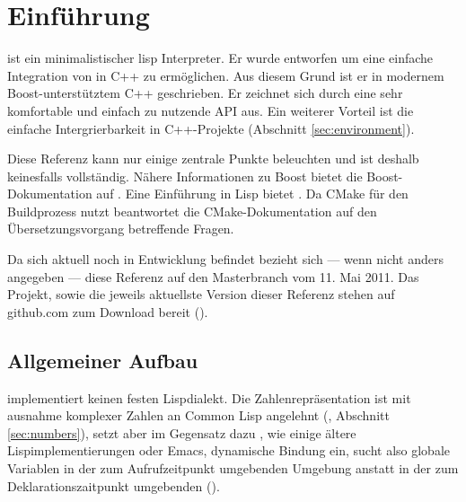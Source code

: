 \section{Einführung}
\label{sec:einfuehrung}

\projectname{} ist ein minimalistischer lisp Interpreter. Er wurde entworfen um eine einfache
Integration von in C++ zu ermöglichen. Aus diesem Grund ist er in modernem Boost-unterstütztem
C++ geschrieben. Er zeichnet sich durch eine sehr komfortable und einfach zu nutzende API aus.
Ein weiterer Vorteil ist die einfache Intergrierbarkeit in C++-Projekte (Abschnitt \ref{sec:environment}).

Diese Referenz kann nur einige zentrale Punkte beleuchten und ist deshalb keinesfalls vollständig. Nähere Informationen zu Boost bietet die Boost-Do\-ku\-men\-ta\-tion auf \cite{smart_ptr_online}. Eine Einführung in Lisp bietet \cite{graham_ansi_1995}. Da \projectname{} CMake für den Buildprozess nutzt beantwortet die CMake-Dokumentation auf \cite{cmake_online} den Übersetzungsvorgang betreffende Fragen.

Da sich \projectname{} aktuell noch in Entwicklung befindet bezieht sich --- wenn nicht anders angegeben --- diese Referenz auf den Masterbranch vom 11. Mai 2011.
Das Projekt, sowie die jeweils aktuellste Version dieser Referenz stehen auf github.com zum Download bereit (\cite{lisp_interaction_online}\cite{lisp_interaction_ref_online}). %

\subsection{Allgemeiner Aufbau}


\projectname{} implementiert keinen festen Lispdialekt. Die Zahlenrepräsentation ist mit ausnahme komplexer Zahlen an Common Lisp angelehnt (\cite[S. 143ff]{graham_ansi_1995}, Abschnitt \ref{sec:numbers}), setzt aber im Gegensatz dazu , wie einige ältere Lispimplementierungen oder Emacs, dynamische Bindung ein, sucht also globale Variablen in der zum Aufrufzeitpunkt umgebenden Umgebung anstatt in der zum Deklarationszaitpunkt umgebenden (\cite[36, 63]{wilhelm_uebersetzerbau_2007}\cite[112]{graham_ansi_1995}).
